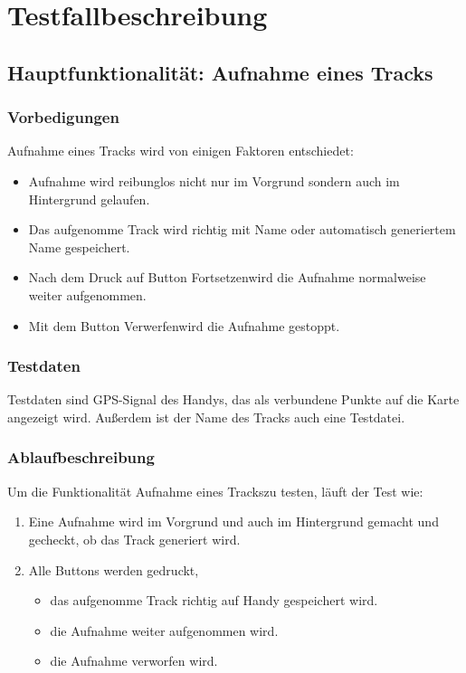 \documentclass{article}
\begin{document}
\section{Testfallbeschreibung}
\subsection{Hauptfunktionalität: Aufnahme eines Tracks}
\subsubsection{Vorbedigungen}
	Aufnahme eines Tracks wird von einigen Faktoren entschiedet:
	\begin{itemize}
		\item Aufnahme wird reibunglos nicht nur im Vorgrund sondern auch im Hintergrund gelaufen.
		\item Das aufgenomme Track wird richtig mit Name oder automatisch generiertem Name gespeichert.
		\item Nach dem Druck auf Button \glqq Fortsetzen\grqq wird die Aufnahme normalweise weiter aufgenommen.
		\item Mit dem Button \glqq Verwerfen\grqq wird die Aufnahme gestoppt.
	\end{itemize}
\subsubsection{Testdaten}
	Testdaten sind GPS-Signal des Handys, das als verbundene Punkte auf die Karte angezeigt wird. Außerdem ist der Name des Tracks auch eine Testdatei.
\subsubsection{Ablaufbeschreibung}
	Um die Funktionalität \glqq Aufnahme eines Tracks\grqq zu testen, läuft der Test wie:
	\begin{enumerate}
		\item Eine Aufnahme wird im Vorgrund und auch im Hintergrund gemacht und gecheckt, ob das Track generiert wird.
		\item Alle Buttons werden gedruckt,
			\begin{itemize}
				\item das aufgenomme Track richtig auf Handy gespeichert wird.
				\item die Aufnahme weiter aufgenommen wird.
				\item die Aufnahme verworfen wird.
			\end{itemize}
	\end{enumerate}
\end{document}
